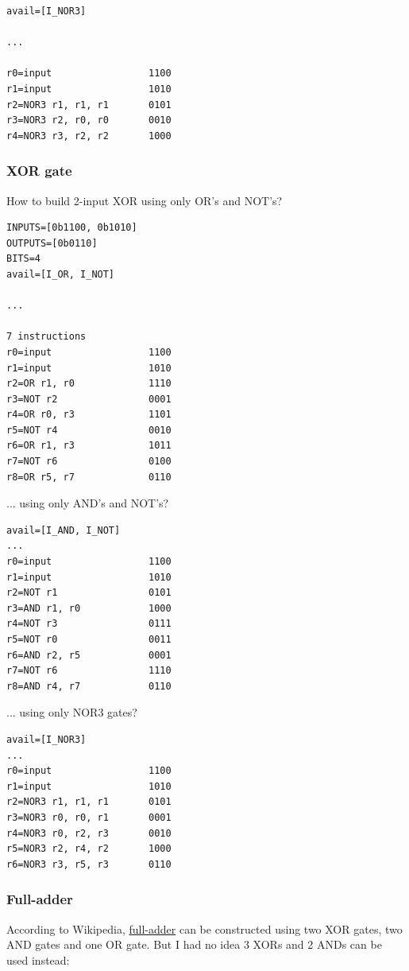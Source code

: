 \begin{lstlisting}
avail=[I_NOR3]

...

r0=input                 1100
r1=input                 1010
r2=NOR3 r1, r1, r1       0101
r3=NOR3 r2, r0, r0       0010
r4=NOR3 r3, r2, r2       1000
\end{lstlisting}

\subsubsection{XOR gate}

How to build 2-input XOR using only OR's and NOT's?

\begin{lstlisting}
INPUTS=[0b1100, 0b1010]
OUTPUTS=[0b0110]
BITS=4
avail=[I_OR, I_NOT]

...

7 instructions
r0=input                 1100
r1=input                 1010
r2=OR r1, r0             1110
r3=NOT r2                0001
r4=OR r0, r3             1101
r5=NOT r4                0010
r6=OR r1, r3             1011
r7=NOT r6                0100
r8=OR r5, r7             0110
\end{lstlisting}

... using only AND's and NOT's?

\begin{lstlisting}
avail=[I_AND, I_NOT]
...
r0=input                 1100
r1=input                 1010
r2=NOT r1                0101
r3=AND r1, r0            1000
r4=NOT r3                0111
r5=NOT r0                0011
r6=AND r2, r5            0001
r7=NOT r6                1110
r8=AND r4, r7            0110
\end{lstlisting}

... using only NOR3 gates?

\begin{lstlisting}
avail=[I_NOR3]
...
r0=input                 1100
r1=input                 1010
r2=NOR3 r1, r1, r1       0101
r3=NOR3 r0, r0, r1       0001
r4=NOR3 r0, r2, r3       0010
r5=NOR3 r2, r4, r2       1000
r6=NOR3 r3, r5, r3       0110
\end{lstlisting}

\subsubsection{Full-adder}

According to Wikipedia, \href{https://en.wikipedia.org/wiki/Adder_(electronics)}{full-adder}
can be constructed using two XOR gates, two AND gates and one OR gate.
But I had no idea 3 XORs and 2 ANDs can be used instead:

